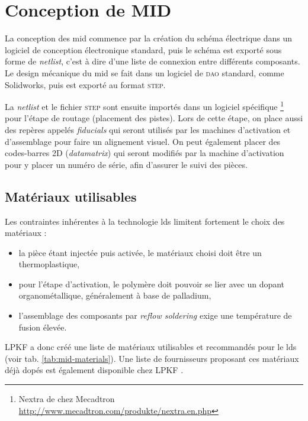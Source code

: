 
\section{Conception de MID}
La conception des \gls{mid} commence par la création du schéma électrique dans un logiciel de conception électronique standard, puis le schéma est exporté sous forme de \emph{netlist}, c'est à dire d'une liste de connexion entre différents composants.
Le design mécanique du \gls{mid} se fait dans un logiciel de \textsc{dao} standard, comme Solidworks, puis est exporté au format \textsc{step}.

La \emph{netlist} et le fichier \textsc{step} sont ensuite importés dans un logiciel spécifique \footnote{Nextra de chez Mecadtron \url{http://www.mecadtron.com/produkte/nextra.en.php}} pour l'étape de routage (placement des pistes).
Lors de cette étape, on place aussi des repères appelés \emph{fiducials} qui seront utilisés par les machines d'activation et d'assemblage pour faire un alignement visuel.
On peut également placer des codes-barres 2D (\emph{datamatrix}) qui seront modifiés par la machine d'activation pour y placer un numéro de série, afin d'assurer le suivi des pièces.

\subsection{Matériaux utilisables}
Les contraintes inhérentes à la technologie \gls{lds} limitent fortement le choix des matériaux :
\begin{itemize}
    \item la pièce étant injectée puis activée, le matériaux choisi doit être un thermoplastique,
    \item pour l'étape d'activation, le polymère doit pouvoir se lier avec un dopant organométallique, généralement à base de palladium,
    \item l'assemblage des composants par \textit{reflow soldering} exige une température de fusion élevée.
\end{itemize}

LPKF a donc créé une liste de matériaux utilisables et recommandés pour le \gls{lds} (voir tab. \ref{tab:mid-materials}).
Une liste de fournisseurs proposant ces matériaux déjà dopés est également disponible chez LPKF \cite{mid-design-rules}.

